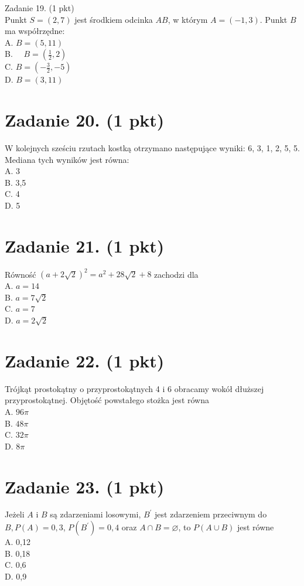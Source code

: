 \documentclass[10pt]{article}
\begin{document}
Zadanie 19. (1 pkt)\\
Punkt \(S=(2,7)\) jest środkiem odcinka \(A B\), w którym \(A=(-1,3)\). Punkt \(B\) ma współrzędne:\\
A. \(B=(5,11)\)\\
B. \(\quad B=\left(\frac{1}{2}, 2\right)\)\\
C. \(B=\left(-\frac{3}{2},-5\right)\)\\
D. \(B=(3,11)\)

\section*{Zadanie 20. (1 pkt)}
W kolejnych sześciu rzutach kostką otrzymano następujące wyniki: 6, 3, 1, 2, 5, 5. Mediana tych wyników jest równa:\\
A. 3\\
B. 3,5\\
C. 4\\
D. 5

\section*{Zadanie 21. (1 pkt)}
Równość \((a+2 \sqrt{2})^{2}=a^{2}+28 \sqrt{2}+8\) zachodzi dla\\
A. \(a=14\)\\
B. \(a=7 \sqrt{2}\)\\
C. \(a=7\)\\
D. \(a=2 \sqrt{2}\)

\section*{Zadanie 22. (1 pkt)}
Trójkąt prostokątny o przyprostokątnych 4 i 6 obracamy wokół dłuższej przyprostokątnej. Objętość powstałego stożka jest równa\\
A. \(96 \pi\)\\
B. \(48 \pi\)\\
C. \(32 \pi\)\\
D. \(8 \pi\)

\section*{Zadanie 23. (1 pkt)}
Jeżeli \(A\) i \(B\) są zdarzeniami losowymi, \(B^{\prime}\) jest zdarzeniem przeciwnym do \(B, P(A)=0,3\), \(P\left(B^{\prime}\right)=0,4\) oraz \(A \cap B=\varnothing\), to \(P(A \cup B)\) jest równe\\
A. 0,12\\
B. 0,18\\
C. 0,6\\
D. 0,9
\end{document}
